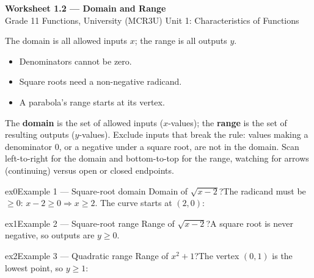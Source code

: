 \documentclass[11pt]{article}
\begin{document}
\begin{center}
{\LARGE\bfseries\color{titleblue}Worksheet 1.2 --- Domain and Range}\\[2pt]
{\small Grade 11 Functions, University (MCR3U) \textperiodcentered{} Unit 1: Characteristics of Functions}
\end{center}

\begin{ideabox}
The domain is all allowed inputs $x$; the range is all outputs $y$.
\begin{itemize}[leftmargin=*,itemsep=2pt]
  \item Denominators cannot be zero.
  \item Square roots need a non-negative radicand.
  \item A parabola's range starts at its vertex.
\end{itemize}
\end{ideabox}

\begin{learnbox}
The \textbf{domain} is the set of allowed inputs ($x$-values); the \textbf{range} is the set of resulting outputs ($y$-values).
Exclude inputs that break the rule: values making a denominator $0$, or a negative under a square root, are not in the domain.
Scan left-to-right for the domain and bottom-to-top for the range, watching for arrows (continuing) versus open or closed endpoints.
\end{learnbox}


\begin{example}{ex0}{Example 1 --- Square-root domain}
Domain of $\sqrt{x-2}$?\soln The radicand must be $\ge0$: $x-2\ge0\Rightarrow x\ge2$. The curve starts at $(2,0)$:
\end{example}

\begin{example}{ex1}{Example 2 --- Square-root range}
Range of $\sqrt{x-2}$?\soln A square root is never negative, so outputs are $y\ge0$.
\end{example}

\begin{example}{ex2}{Example 3 --- Quadratic range}
Range of $x^2+1$?\soln The vertex $(0,1)$ is the lowest point, so $y\ge1$:
\end{example}
\end{document}

